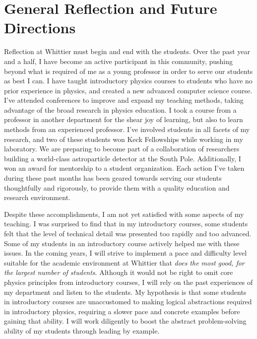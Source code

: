 \documentclass[../../main.tex]{subfiles}
\begin{document}
\section{General Reflection and Future Directions}

Reflection at Whittier must begin and end with the students.  Over the past year and a half, I have become an active participant in this community, pushing beyond what is required of me as a young professor in order to serve our students as best I can.  I have taught introductory physics courses to students who have no prior experience in physics, and created a new advanced computer science course.  I've attended conferences to improve and expand my teaching methods, taking advantage of the broad research in physics education.  I took a course from a professor in another department for the shear joy of learning, but also to learn methods from an experienced professor.  I've involved students in all facets of my research, and two of these students won Keck Fellowships while working in my laboratory.  We are preparing to become part of a collaboration of researchers building a world-class astroparticle detector at the South Pole.  Additionally, I won an award for mentorship to a student organization.  Each action I've taken during these past months has been geared towards serving our students thoughtfully and rigorously, to provide them with a quality education and research environment. \\ \hspace{0.1cm}

Despite these accomplishments, I am not yet satisfied with some aspects of my teaching.  I was surprised to find that in my introductory courses, some students felt that the level of technical detail was presented too rapidly and too advanced.  Some of my students in an introductory course actively helped me with these issues.  In the coming years, I will strive to implement a pace and difficulty level suitable for the academic environment at Whittier that \textit{does the most good, for the largest number of students}.  Although it would not be right to omit core physics principles from introductory courses, I will rely on the past experiences of my department and listen to the students.  My hypothesis is that some students in introductory courses are unaccustomed to making logical abstractions required in introductory physics, requiring a slower pace and concrete examples before gaining that ability.  I will work diligently to boost the abstract problem-solving ability of my students through leading by example.
\end{document}
